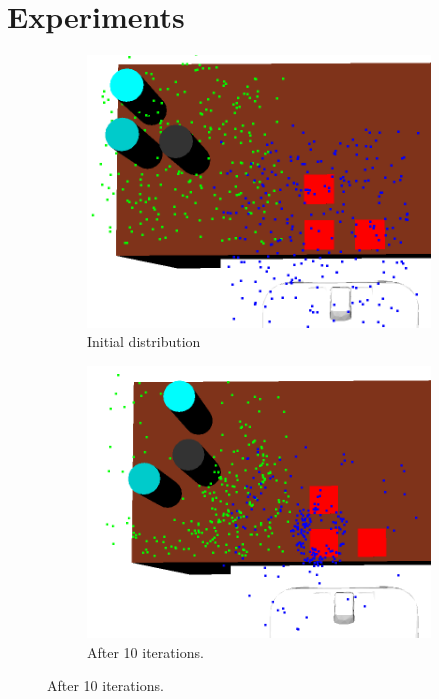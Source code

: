 \section{Experiments}
\begin{figure}
  \centering
  \begin{subfigure}[b]{0.48\linewidth}
    \includegraphics[width=\textwidth]{images/learns.png}
    \caption{Initial distribution}
  \end{subfigure}
  \begin{subfigure}[b]{0.48\linewidth}
    \includegraphics[width=\textwidth]{images/learn10.png}
    \caption{After 10 iterations.}

\end{subfigure}
\end{figure}
